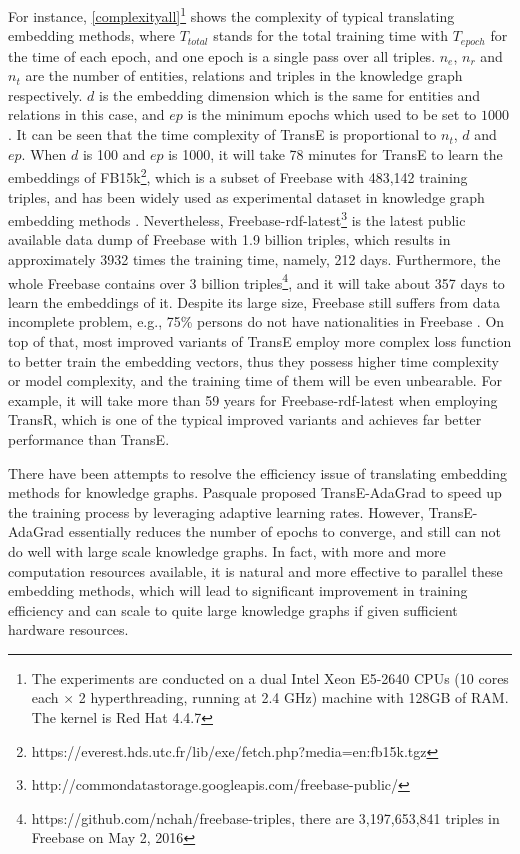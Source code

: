 \documentclass[sigconf]{acmart}
\begin{document}
For instance, \tablename \ref{complexityall}\footnote{The experiments are conducted on a dual Intel Xeon E5-2640 CPUs (10 cores each $\times$ 2 hyperthreading, running at 2.4 GHz) machine with 128GB of RAM. The kernel is Red Hat 4.4.7} shows the complexity of typical translating embedding methods,  
where $T_{total}$ stands for the total training time with $T_{epoch}$ for the time of each epoch, and one epoch is a single pass over all triples. 
$n_e$, $n_{r}$ and $n_t$ are the number of entities, relations and triples in  the knowledge graph respectively. $d$ is the embedding dimension which is the same for entities and relations in this case, and  $ep$ is the minimum epochs which used to be set to $1000$. It can be seen that the time complexity of TransE is proportional to $n_t$, $d$ and $ep$.
When $d$ is 100 and $ep$ is 1000, it will take 78 minutes for TransE to learn the embeddings of FB15k\footnote{https://everest.hds.utc.fr/lib/exe/fetch.php?media=en:fb15k.tgz}, which is a subset of Freebase with 483,142 training triples, and has been widely used as experimental dataset in knowledge graph embedding methods \cite{bordes2013translating,Wang2014Knowledge,Lin2015Learning,jia2016locally}. Nevertheless, Freebase-rdf-latest\footnote{http://commondatastorage.googleapis.com/freebase-public/ } is the latest public available data dump of Freebase with 1.9 billion triples, which results in approximately 3932 times the training time, namely, 212 days. Furthermore, the whole Freebase contains over 3 billion triples\footnote{https://github.com/nchah/freebase-triples, there are 3,197,653,841 triples in Freebase on May 2, 2016}, and it will take about 357 days to learn the embeddings of it.
Despite its large size, Freebase still suffers from data incomplete problem, e.g., 75\% persons do not have nationalities in Freebase \cite{Dong2014Knowledge}. On top of that, most improved variants of TransE employ more complex loss function to better train the embedding vectors, thus they possess higher time complexity or model complexity, and the training time of them will be even unbearable. For example, it will take more than 59 years for Freebase-rdf-latest when employing TransR, which is one of the typical improved variants and achieves far better performance than TransE.











There have been attempts to resolve the efficiency issue of translating embedding methods for knowledge graphs. 
Pasquale\cite{minervini2015efficient} proposed TransE-AdaGrad 
 to speed up the training process by leveraging adaptive learning rates. 
However, TransE-AdaGrad essentially reduces the number of epochs to converge, and still can not do well with large scale knowledge graphs.
In fact, with more and more computation resources available, 
it is natural and more effective to parallel these embedding methods, which will lead to significant improvement in training efficiency and can scale to quite large knowledge graphs if given sufficient hardware resources. 
\end{document}
